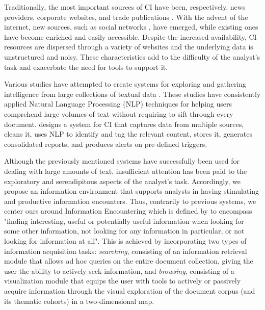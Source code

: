 \documentclass[a4paper]{article}
\begin{document}
Traditionally, the most important sources of CI have been, respectively, news providers, corporate websites, and trade publications \citep{marin2004}. With the advent of the internet, new sources, such as social networks \citet{dey2011}, have emerged, while existing ones have become enriched and easily accessible. Despite the increased availability, CI resources are dispersed through a variety of websites and the underlying data is unstructured and noisy. These characteristics add to the difficulty of the analyst's task and exacerbate the need for tools to support it.

Various studies have attempted to create systems for exploring and gathering intelligence from large collections of textual data \citep{dey2011, esteva2020, lafia2019, lafia2021a}. These studies have consistently applied Natural Language Processing (NLP) techniques for helping users comprehend large volumes of text without requiring to sift through every document. \citet{dey2011} designs a system for CI that captures data from multiple sources, cleans it, uses NLP to identify and tag the relevant content, stores it, generates consolidated reports, and produces alerts on pre-defined triggers.

Although the previously mentioned systems have successfully been used for dealing with large amounts of text, insufficient attention has been paid to the exploratory and serendipitous aspects of the analyst's task. Accordingly, we propose an information environment that supports analysts in having stimulating and productive information encounters. Thus, contrarily to previous systems, we center ours around Information Encountering which is defined by \citet{erdelez2020} to encompass "finding interesting, useful or potentially useful information when looking for some other information, not looking for any information in particular, or not looking for information at all". This is achieved by incorporating two types of information acquisition tasks: \emph{searching}, consisting of an information retrieval module that allows ad hoc queries on the entire document collection, giving the user the ability to actively seek information, and \emph{browsing}, consisting of a visualization module that equips the user with tools to actively or passively acquire information through the visual exploration of the document corpus (and its thematic cohorts) in a two-dimensional map. 
\end{document}
